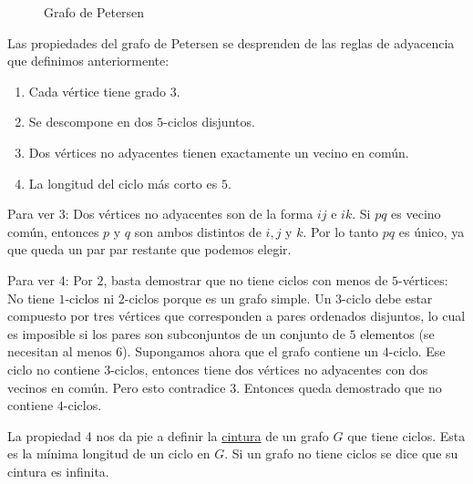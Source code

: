 \begin{figure}
    \centering
    \caption{Grafo de Petersen}
    \label{fig:petersen}
\end{figure}

\begin{nota}
    Las propiedades del grafo de Petersen se desprenden de las reglas de adyacencia que definimos anteriormente:
    
    \begin{enumerate}
        \item Cada vértice tiene grado $3$.
        \item Se descompone en dos $5$-ciclos disjuntos.
        \item Dos vértices no adyacentes tienen exactamente un vecino en común.
        \item La longitud del ciclo más corto es $5$.
    \end{enumerate}
\end{nota}

\begin{ejer}
    Para ver 3: Dos vértices no adyacentes son de la forma $ij$ e $ik$. Si $pq$ es vecino común, entonces $p$ y $q$ son ambos distintos de $i, j$ y $k$. Por lo tanto $pq$ es único, ya que queda un par par restante que podemos elegir.
    
    Para ver 4: Por $2$, basta demostrar que no tiene ciclos con menos de $5$-vértices: No tiene $1$-ciclos ni $2$-ciclos porque es un grafo simple. Un $3$-ciclo debe estar compuesto por tres vértices que corresponden a pares ordenados disjuntos, lo cual es imposible si los pares son subconjuntos de un conjunto de $5$ elementos (se necesitan al menos $6$). Supongamos ahora que el grafo contiene un $4$-ciclo. Ese ciclo no contiene $3$-ciclos, entonces tiene dos vértices no adyacentes con dos vecinos en común. Pero esto contradice 3. Entonces queda demostrado que no contiene $4$-ciclos.
\end{ejer}

\begin{defn}
    La propiedad 4 nos da pie a definir la \ul{cintura} de un grafo $G$ que tiene ciclos. Esta es la mínima longitud de un ciclo en $G$. Si un grafo no tiene ciclos se dice que su cintura es infinita.
\end{defn}

